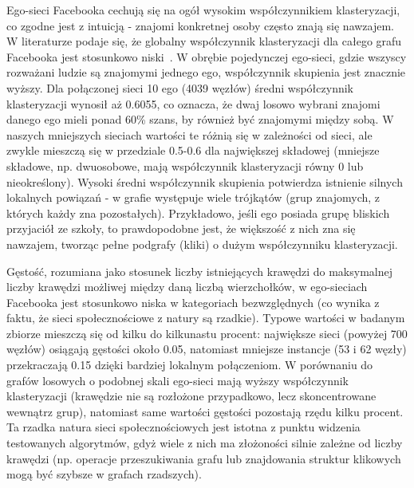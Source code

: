Ego-sieci Facebooka cechują się na ogół wysokim współczynnikiem klasteryzacji, co zgodne jest z intuicją - znajomi konkretnej osoby często znają się nawzajem. W literaturze podaje się, że globalny współczynnik klasteryzacji dla całego grafu Facebooka jest stosunkowo niski~\cite{Ugander2011}. W obrębie pojedynczej ego-sieci, gdzie wszyscy rozważani ludzie są znajomymi jednego ego, współczynnik skupienia jest znacznie wyższy. Dla połączonej sieci 10 ego (4039 węzłów) średni współczynnik klasteryzacji wynosił aż 0.6055, co oznacza, że dwaj losowo wybrani znajomi danego ego mieli ponad 60\% szans, by również być znajomymi między sobą. W naszych mniejszych sieciach wartości te różnią się w zależności od sieci, ale zwykle mieszczą się w przedziale 0.5-0.6 dla największej składowej (mniejsze składowe, np. dwuosobowe, mają współczynnik klasteryzacji równy 0 lub nieokreślony). Wysoki średni współczynnik skupienia potwierdza istnienie silnych lokalnych powiązań - w grafie występuje wiele trójkątów (grup znajomych, z których każdy zna pozostałych). Przykładowo, jeśli ego posiada grupę bliskich przyjaciół ze szkoły, to prawdopodobne jest, że większość z nich zna się nawzajem, tworząc pełne podgrafy (kliki) o dużym współczynniku klasteryzacji.

Gęstość, rozumiana jako stosunek liczby istniejących krawędzi do maksymalnej liczby krawędzi możliwej między daną liczbą wierzchołków, w ego-sieciach Facebooka jest stosunkowo niska w kategoriach bezwzględnych (co wynika z faktu, że sieci społecznościowe z natury są rzadkie). Typowe wartości w badanym zbiorze mieszczą się od kilku do kilkunastu procent: największe sieci (powyżej 700 węzłów) osiągają gęstości około 0.05, natomiast mniejsze instancje (53 i 62 węzły) przekraczają 0.15 dzięki bardziej lokalnym połączeniom. W porównaniu do grafów losowych o podobnej skali ego-sieci mają wyższy współczynnik klasteryzacji (krawędzie nie są rozłożone przypadkowo, lecz skoncentrowane wewnątrz grup), natomiast same wartości gęstości pozostają rzędu kilku procent. Ta rzadka natura sieci społecznościowych jest istotna z punktu widzenia testowanych algorytmów, gdyż wiele z nich ma złożoności silnie zależne od liczby krawędzi (np. operacje przeszukiwania grafu lub znajdowania struktur klikowych mogą być szybsze w grafach rzadszych).
